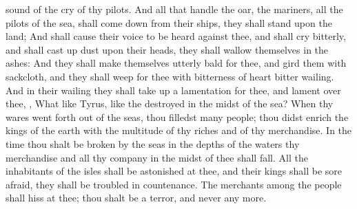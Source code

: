 {sound of the
cry of thy
pilots.
And all that
handle the
oar, the
mariners,
{} all the
pilots of the
sea, shall come
down from their
ships, they shall
stand upon the
land;
And shall cause their
voice to be
heard against thee, and shall
cry
bitterly, and shall cast
up
dust upon their
heads, they shall
wallow themselves in the
ashes:
And they shall make themselves
utterly
bald for thee, and
gird them with
sackcloth, and they shall
weep for thee with
bitterness of
heart
{}
bitter
wailing.
And in their
wailing they shall take
up a
lamentation for thee, and
lament over thee,
{}, What
{} like
Tyrus, like the
destroyed in the
midst of the
sea?
When thy
wares went
forth out of the
seas, thou
filledst
many
people; thou didst
enrich the
kings of the
earth with the
multitude of thy
riches and of thy
merchandise.
In the
time
{} thou shalt be
broken by the
seas in the
depths of the
waters thy
merchandise and all thy
company in the
midst of thee shall
fall.
All the
inhabitants of the
isles shall be
astonished at thee, and their
kings shall be
sore
afraid, they shall be
troubled in
{}
countenance.
The
merchants among the
people shall
hiss at thee; thou shalt be a
terror, and never
{} any
more.

}
